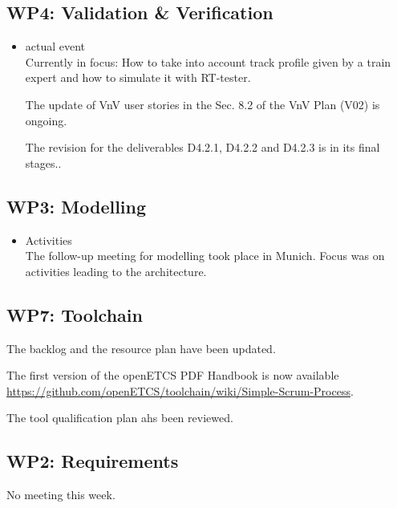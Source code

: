 \documentclass[a4paper, 11pt]{article}
\begin{document}
\subsection{WP4: Validation \& Verification}
\begin{itemize}
\item actual event\\
Currently in focus: How to take into account track profile given by a train expert and how to simulate it with RT-tester.

The  update of VnV user stories in the Sec. 8.2 of the VnV Plan (V02) is ongoing. 

The revision for the deliverables D4.2.1, D4.2.2 and D4.2.3 is in its final stages.. 

\end{itemize}

\subsection{WP3: Modelling}

\begin{itemize}
\item Activities\\
The follow-up meeting for modelling took place in Munich. Focus was on activities leading to the architecture. 

\end{itemize}

\subsection{WP7: Toolchain}

The backlog and the resource plan have been updated.

The first version of the openETCS PDF Handbook is now available \url{https://github.com/openETCS/toolchain/wiki/Simple-Scrum-Process}.

The tool qualification plan ahs been reviewed.

\subsection{WP2: Requirements}

No meeting this week.
\end{document}
